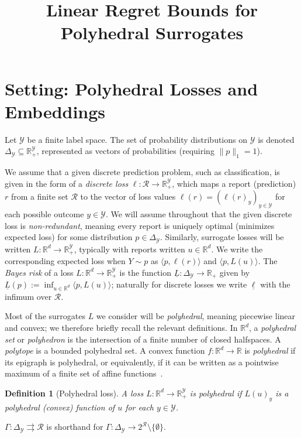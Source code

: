 \documentclass[12pt]{article}
\title{Linear Regret Bounds for Polyhedral Surrogates}
\newcommand{\reals}{\mathbb{R}}
\newcommand{\simplex}{\Delta_\Y}
\newcommand{\R}{\mathcal{R}}
\newcommand{\Y}{\mathcal{Y}}
\newcommand{\risk}[1]{\underline{#1}}
\newcommand{\inprod}[2]{\langle #1, #2 \rangle}%
\newcommand{\toto}{\rightrightarrows}
\newtheorem{definition}{Definition}
\begin{document}
\maketitle


\section{Setting: Polyhedral Losses and Embeddings}

Let $\Y$ be a finite label space.
The set of probability distributions on $\Y$ is denoted $\simplex\subseteq\reals^{\Y}_+$, represented as vectors of probabilities (requiring $\|p\|_1 = 1$).

We assume that a given discrete prediction problem, such as classification, is given in the form of a \emph{discrete loss} $\ell:\R\to\reals^\Y_+$, which maps a report (prediction) $r$ from a finite set $\R$ to the vector of loss values $\ell(r) = (\ell(r)_y)_{y\in\Y}$ for each possible outcome $y\in\Y$.
We will assume throughout that the given discrete loss is \emph{non-redundant}, meaning every report is uniquely optimal (minimizes expected loss) for some distribution $p\in\simplex$.
Similarly, surrogate losses will be written $L:\reals^d\to\reals^\Y_+$, typically with reports written $u\in\reals^d$.
We write the corresponding expected loss when $Y \sim p$ as $\inprod{p}{\ell(r)}$ and $\inprod{p}{L(u)}$.
The \emph{Bayes risk} of a loss $L:\reals^d\to\reals^\Y_+$ is the function $\risk{L}:\simplex\to\reals_+$ given by $\risk{L}(p) := \inf_{u\in\reals^d} \inprod{p}{L(u)}$; naturally for discrete losses we write $\risk{\ell}$ with the infimum over $\R$.

Most of the surrogates $L$ we consider will be \emph{polyhedral}, meaning piecewise linear and convex; we therefore briefly recall the relevant definitions.
In $\reals^d$, a \emph{polyhedral set} or \emph{polyhedron} is the intersection of a finite number of closed halfspaces.
A \emph{polytope} is a bounded polyhedral set.
A convex function $f:\reals^d\to\reals$ is \emph{polyhedral} if its epigraph is polyhedral, or equivalently, if it can be written as a pointwise maximum of a finite set of affine functions~\cite{rockafellar1997convex}.

\begin{definition}[Polyhedral loss]
  A loss $L: \reals^d \to \reals^{\Y}_+$ is \emph{polyhedral} if $L(u)_y$ is a polyhedral (convex) function of $u$ for each $y\in\Y$.
\end{definition}

$\Gamma: \simplex \toto \R$ is shorthand for $\Gamma: \simplex \to 2^{\R} \setminus \{\emptyset\}$.
\end{document}

